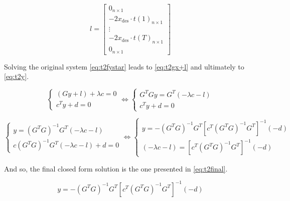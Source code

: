 \begin{equation}
\label{eq:t2l}
l = 
\left[
\begin{array}{c}
0_{n \times 1} \\
-2 x_{\text{des}} \cdot t(1)_{n \times 1} \\
\vdots \\
-2 x_{\text{des}} \cdot t(T)_{n \times 1} \\
0_{n \times 1}
\end{array}
\right]
\end{equation}


Solving the original system \eqref{eq:t2fystar} leads to \eqref{eq:t2gx+l} and ultimately to \eqref{eq:t2y}.

\begin{equation}
\label{eq:t2gx+l}
\begin{cases}
	(Gy + l) + \lambda c = 0 \\
	c^T y + d = 0
\end{cases} \Leftrightarrow
\begin{cases}
	G^T G y = G^T (- \lambda c - l) \\
	c^T y + d = 0
\end{cases}
\end{equation}

\begin{equation}
\label{eq:t2y}
\begin{cases}
	y = (G^T G)^{-1} G^T (- \lambda c -l) \\
	c (G^T G)^{-1} G^T (- \lambda c - l) + d = 0
\end{cases} \Leftrightarrow
\begin{cases}
	y = - (G^T G)^{-1} G^T [c^T (G^T G)^{-1} G^T]^{-1} (-d) \\
	(-\lambda c - l) = [c^T (G^T G)^{-1} G^T]^{-1} (-d)  
\end{cases}
\end{equation}

And so, the final closed form solution is the one presented in \eqref{eq:t2final}.

\begin{equation}
\label{eq:t2final}
    y = - (G^T G)^{-1} G^T [c^T (G^T G)^{-1} G^T]^{-1} (-d)
\end{equation}
